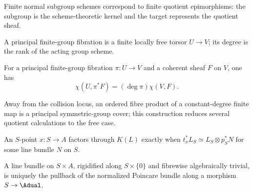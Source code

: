 \begin{corollary}
\label{mumford3-normal-finite-subgroup-correspondence}
Finite normal subgroup schemes correspond to finite quotient epimorphisms:
the subgroup is the scheme-theoretic kernel and the target represents the
quotient sheaf.
\notready
\end{corollary}

\begin{definition}
\label{mumford3-principal-fibration}
A principal finite-group fibration is a finite locally free torsor
$U\to V$; its degree is the rank of the acting group scheme.
\notready
\end{definition}

\begin{theorem}
\label{mumford3-euler-characteristic-quotient}
For a principal finite-group fibration $\pi:U\to V$ and a coherent sheaf $F$
on $V$, one has
\[
 \chi(U,\pi^*F)=(\deg\pi)\chi(V,F).
\]
\notready
\end{theorem}

\begin{remark}
\label{mumford3-finite-morphism-symmetric-quotient}
Away from the collision locus, an ordered fibre product of a constant-degree
finite map is a principal symmetric-group cover; this construction reduces
several quotient calculations to the free case.
\notready
\end{remark}

\begin{proposition}
\label{mumford3-kernel-valued-point-criterion}
An $S$-point $x:S\to A$ factors through $K(L)$ exactly when
$t_x^*L_S\simeq L_S\otimes p_S^*N$ for some line bundle $N$ on $S$.
\notready
\end{proposition}

\begin{theorem}
\label{mumford3-poincare-universal-mapping}
A line bundle on $S\times A$, rigidified along $S\times\{0\}$ and fibrewise
algebraically trivial, is uniquely the pullback of the normalized Poincare
bundle along a morphism $S\to\Adual$.
\notready
\end{theorem}

